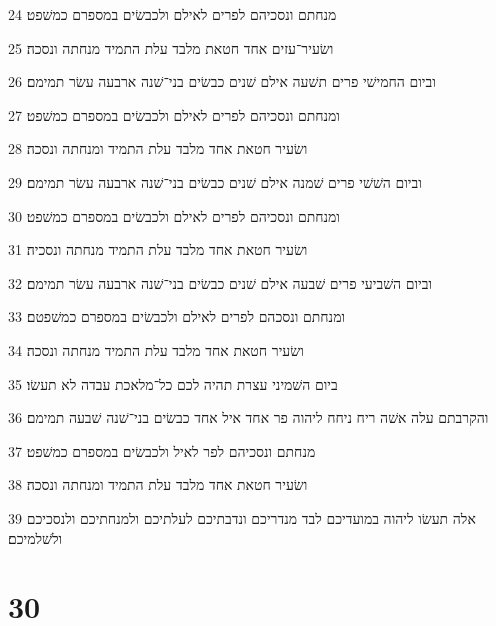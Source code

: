 \par 24 מנחתם ונסכיהם לפרים לאילם ולכבשׂים במספרם כמשׁפט׃
\par 25 ושׂעיר־עזים אחד חטאת מלבד עלת התמיד מנחתה ונסכה׃
\par 26 וביום החמישׁי פרים תשׁעה אילם שׁנים כבשׂים בני־שׁנה ארבעה עשׂר תמימם׃
\par 27 ומנחתם ונסכיהם לפרים לאילם ולכבשׂים במספרם כמשׁפט׃
\par 28 ושׂעיר חטאת אחד מלבד עלת התמיד ומנחתה ונסכה׃
\par 29 וביום השׁשׁי פרים שׁמנה אילם שׁנים כבשׂים בני־שׁנה ארבעה עשׂר תמימם׃
\par 30 ומנחתם ונסכיהם לפרים לאילם ולכבשׂים במספרם כמשׁפט׃
\par 31 ושׂעיר חטאת אחד מלבד עלת התמיד מנחתה ונסכיה׃
\par 32 וביום השׁביעי פרים שׁבעה אילם שׁנים כבשׂים בני־שׁנה ארבעה עשׂר תמימם׃
\par 33 ומנחתם ונסכהם לפרים לאילם ולכבשׂים במספרם כמשׁפטם׃
\par 34 ושׂעיר חטאת אחד מלבד עלת התמיד מנחתה ונסכה׃
\par 35 ביום השׁמיני עצרת תהיה לכם כל־מלאכת עבדה לא תעשׂו׃
\par 36 והקרבתם עלה אשׁה ריח ניחח ליהוה פר אחד איל אחד כבשׂים בני־שׁנה שׁבעה תמימם׃
\par 37 מנחתם ונסכיהם לפר לאיל ולכבשׂים במספרם כמשׁפט׃
\par 38 ושׂעיר חטאת אחד מלבד עלת התמיד ומנחתה ונסכה׃
\par 39 אלה תעשׂו ליהוה במועדיכם לבד מנדריכם ונדבתיכם לעלתיכם ולמנחתיכם ולנסכיכם ולשׁלמיכם׃

\chapter{30}

